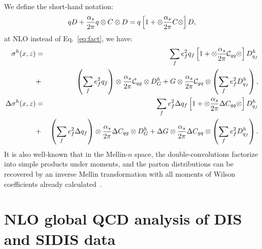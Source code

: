 We define the short-hand notation:
 \begin{eqnarray}
  qD + {\alpha_s \over 2 \pi} q \otimes C \otimes D = 
 q \left[ 1+ \otimes {\alpha_s \over 2 \pi} C \otimes \right] D,
\end{eqnarray}
at NLO instead of Eq.~\ref{eq:fact}, we have:
 \begin{eqnarray}
\label{Eq:nlo1}
\sigma^h(x,z) & = & \sum_{f}  e_f^2 q_f \left[ 1 + \otimes {\alpha_s \over 2 \pi} {\cal C}_{qq} \otimes \right] 
          D_{q_f}^{h}  \nonumber \\ 
& + & \left( \sum_{f}  e_f^2 q_f \right) \otimes {\alpha_s \over 2 \pi} {\cal C}_{qg} \otimes D_G^h
+ G \otimes {\alpha_s \over 2 \pi} {\cal C}_{gq} \otimes \left( \sum_{f} e_f^2 D_{q_f}^{h} \right),  \\
\label{Eq:nlo2}
\Delta \sigma^h(x,z) & = & \sum_{f}  e_f^2 \Delta q_f \left[ 1 + \otimes {\alpha_s \over 2 \pi} \Delta C_{qq} 
 \otimes \right] 
          D_{q_f}^{h}  \nonumber \\ 
& + & \left( \sum_{f}  e_f^2 \Delta q_f \right) \otimes {\alpha_s \over 2 \pi} \Delta C_{qg} \otimes D_G^h
+ \Delta G \otimes {\alpha_s \over 2 \pi} \Delta C_{gq} \otimes \left( \sum_{f} e_f^2 D_{q_f}^{h} \right).
\end{eqnarray}
It is also well-known that in the 
Mellin-$n$ space,
the double-convolutions factorize into simple products under moments, and the parton distributions 
can be recovered by an inverse Mellin transformation with all moments of Wilson
coefficients already calculated~\cite{stratmann2001}. 


\section{NLO global QCD analysis of DIS and SIDIS data}

